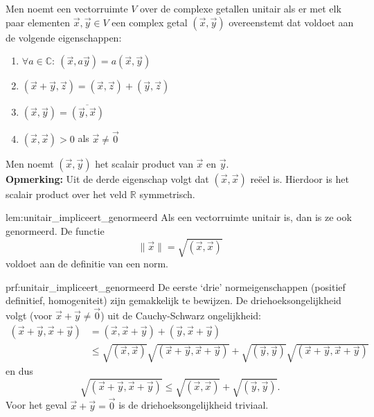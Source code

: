 \begin{theo}
    Men noemt een vectorruimte $V$ over de complexe getallen unitair als er met elk paar elementen $\vec{x}, \vec{y} \in V$ een complex getal $(\vec{x},\vec{y})$ overeenstemt dat voldoet aan de volgende eigenschappen:
    \begin{enumerate}
        \item $\forall a \in \mathbb{C}: \ (\vec{x},a\vec{y}) = a(\vec{x},\vec{y})$
        \item $(\vec{x} + \vec{y},\vec{z}) = (\vec{x},\vec{z}) + (\vec{y},\vec{z})$
        \item $(\vec{x},\vec{y}) = \overline{(\vec{y},\vec{x})}$
        \item $(\vec{x},\vec{x}) > 0$ als $\vec{x} \neq \vec{0}$
    \end{enumerate}
    Men noemt $(\vec{x},\vec{y})$ het scalair product van $\vec{x}$ en $\vec{y}$. \\

    \textbf{Opmerking:} Uit de derde eigenschap volgt dat $(\vec{x},\vec{x})$ reëel is. Hierdoor is het scalair product over het veld $\mathbb{R}$ symmetrisch.
\end{theo}

\begin{lem}{lem:unitair_impliceert_genormeerd}
    Als een vectorruimte unitair is, dan is ze ook genormeerd. De functie
    \begin{equation*}
        \| \vec{x} \| = \sqrt{(\vec{x},\vec{x})}
    \end{equation*}
    voldoet aan de definitie van een norm.
\end{lem}

\newpage

\begin{prf}{prf:unitair_impliceert_genormeerd}
    De eerste `drie' normeigenschappen (positief definitief, homogeniteit) zijn gemakkelijk te bewijzen. De driehoeksongelijkheid volgt (voor $\vec{x} + \vec{y} \neq \vec{0}$) uit de Cauchy-Schwarz ongelijkheid:
    \begin{align*}
        (\vec{x} + \vec{y},\vec{x} + \vec{y}) 
            &= (\vec{x}, \vec{x} + \vec{y}) + (\vec{y}, \vec{x} + \vec{y}) \\
            &\leq \sqrt{(\vec{x},\vec{x})} \sqrt{(\vec{x} + \vec{y},\vec{x} + \vec{y})} + \sqrt{(\vec{y},\vec{y})} \sqrt{(\vec{x} + \vec{y},\vec{x} + \vec{y})} 
    \end{align*}
    en dus
    \begin{equation*}
        \sqrt{(\vec{x} + \vec{y},\vec{x} + \vec{y})} \leq \sqrt{(\vec{x},\vec{x})} + \sqrt{(\vec{y},\vec{y})}.
    \end{equation*}
    Voor het geval $\vec{x} + \vec{y} = \vec{0}$ is de driehoeksongelijkheid triviaal.
\end{prf}

